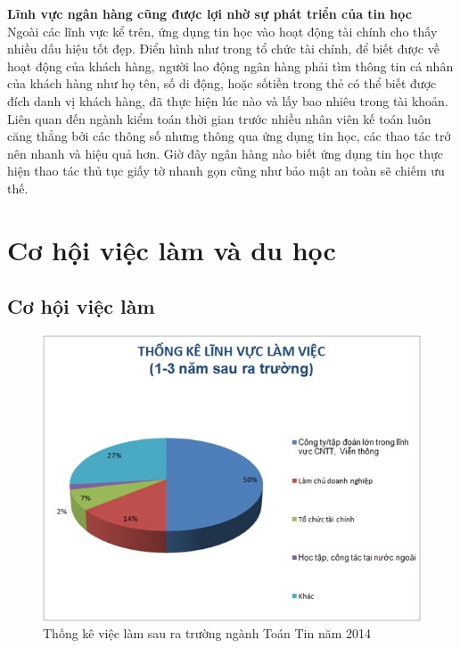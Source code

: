 \documentclass[12pt,a4paper]{report}
\begin{document}
     \textbf{Lĩnh vực ngân hàng cũng được lợi nhờ sự phát triển của tin học}\\
     Ngoài các lĩnh vực kể trên, ứng dụng tin học vào hoạt động tài chính cho thấy nhiều dấu hiệu tốt đẹp. Điển hình như trong tổ chức tài chính, để biết được về hoạt động của khách hàng, người lao động ngân hàng phải tìm thông tin cá nhân của khách hàng như họ tên, số di động, hoặc sốtiền trong thẻ có thể biết được đích danh vị khách hàng, đã thực hiện lúc nào và lấy bao nhiêu trong tài khoản.\\  
     Liên quan đến ngành kiểm toán thời gian trước nhiều nhân viên kế toán luôn căng thẳng bởi các thông số nhưng thông qua ứng dụng tin học, các thao tác trở nên nhanh và hiệu quả hơn. Giờ đây ngân hàng nào biết ứng dụng tin học thực hiện thao tác thủ tục giấy tờ nhanh gọn cũng như bảo mật an toàn sẽ chiếm ưu thế.\\





    
    
    
    \chapter{Cơ hội việc làm và du học}
    \section{Cơ hội việc làm}
    \begin{figure}[h]
    	\centering
    		\includegraphics[scale=1]{1.jpg}
    			\caption{Thống kê việc làm sau ra trường ngành Toán Tin năm 2014}
    \end{figure}
\end{document}
